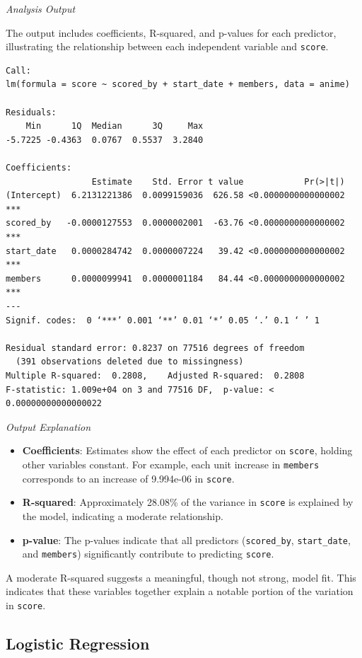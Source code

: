 \documentclass[
]{book}
\providecommand{\tightlist}{%
  \setlength{\itemsep}{0pt}\setlength{\parskip}{0pt}}
\begin{document}
\emph{Analysis Output}

The output includes coefficients, R-squared, and p-values for each predictor, illustrating the relationship between each independent variable and \texttt{score}.

\begin{verbatim}
Call:
lm(formula = score ~ scored_by + start_date + members, data = anime)

Residuals:
    Min      1Q  Median      3Q     Max 
-5.7225 -0.4363  0.0767  0.5537  3.2840 

Coefficients:
                 Estimate    Std. Error t value            Pr(>|t|)    
(Intercept)  6.2131221386  0.0099159036  626.58 <0.0000000000000002 ***
scored_by   -0.0000127553  0.0000002001  -63.76 <0.0000000000000002 ***
start_date   0.0000284742  0.0000007224   39.42 <0.0000000000000002 ***
members      0.0000099941  0.0000001184   84.44 <0.0000000000000002 ***
---
Signif. codes:  0 ‘***’ 0.001 ‘**’ 0.01 ‘*’ 0.05 ‘.’ 0.1 ‘ ’ 1

Residual standard error: 0.8237 on 77516 degrees of freedom
  (391 observations deleted due to missingness)
Multiple R-squared:  0.2808,    Adjusted R-squared:  0.2808 
F-statistic: 1.009e+04 on 3 and 77516 DF,  p-value: < 0.00000000000000022
\end{verbatim}

\emph{Output Explanation}

\begin{itemize}
\tightlist
\item
  \textbf{Coefficients}: Estimates show the effect of each predictor on \texttt{score}, holding other variables constant. For example, each unit increase in \texttt{members} corresponds to an increase of 9.994e-06 in \texttt{score}.
\item
  \textbf{R-squared}: Approximately 28.08\% of the variance in \texttt{score} is explained by the model, indicating a moderate relationship.
\item
  \textbf{p-value}: The p-values indicate that all predictors (\texttt{scored\_by}, \texttt{start\_date}, and \texttt{members}) significantly contribute to predicting \texttt{score}.
\end{itemize}

A moderate R-squared suggests a meaningful, though not strong, model fit. This indicates that these variables together explain a notable portion of the variation in \texttt{score}.

\subsection*{Logistic Regression}\label{logistic-regression}
\end{document}
